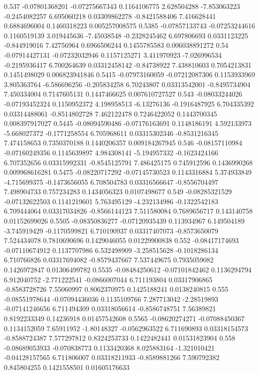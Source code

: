 {0.537 -0.07801368201 -0.07275667343 0.1164106775 2.628504288 -7.853063223 -0.2454082257 6.695060218 0.03309862278 -0.8421588406 7.416628441 0.6884696004 0.1460318223 0.005257008575
0.5385 -0.07857133743 -0.07253244616 0.1160519139 3.019445636 -7.45038548 -0.2328245462 6.697806693 0.0331123225 -0.844919016 7.42756964 0.6966506244 0.1455785583 0.006038891272
0.54 -0.07914427131 -0.07232032946 0.1157125271 3.411970923 -7.026996534 -0.2195936417 6.700264639 0.03312458142 -0.84738922 7.438810603 0.7054213831 0.1451498029 0.006823941846
0.5415 -0.07973160059 -0.07212087306 0.1153933969 3.805363764 -6.586696256 -0.205834258 6.70243807 0.03313542001 -0.8495734904 7.450334004 0.7147605131 0.1447466625 0.007610727527
0.543 -0.08033244026 -0.07193452324 0.1150952372 4.198958513 -6.13276136 -0.1916487925 6.704335392 0.03314488061 -0.8514802728 7.462122478 0.7246422052 0.1443700345 0.008397917027
0.5445 -0.08094590486 -0.07176163691 0.1148186191 4.592133973 -5.668027372 -0.1771258554 6.705968611 0.03315302346 -0.8531216345 7.474158653 0.7350370188 0.1440206357 0.009184267945
0.546 -0.08157110984 -0.07160249356 0.1145639897 4.984308141 -5.194957332 -0.1623424166 6.707352656 0.03315992331 -0.8545125791 7.486425175 0.745912596 0.1436990268 0.009968616281
0.5475 -0.08220717292 -0.07145730523 0.1143316884 5.374933849 -4.715699375 -0.1473656055 6.708504783 0.03316566647 -0.8556704497 7.498904733 0.757234283 0.1434056323 0.0107498677
0.549 -0.08285321529 -0.07132622503 0.1141219601 5.763495129 -4.232134986 -0.1322542183 6.709444064 0.03317034826 -0.8566144123 7.511580084 0.7689656717 0.143140758 0.01152699026
0.5505 -0.08350836277 -0.07120935439 0.113934967 6.149504189 -3.745919429 -0.1170599821 6.710190937 0.03317407073 -0.8573650079 7.524434078 0.7810690696 0.1429046055 0.01229900838
0.552 -0.08417174693 -0.07110674912 0.1137707986 6.532498909 -3.258515628 -0.1018286134 6.710766826 0.03317694082 -0.8579437667 7.537449675 0.7935059082 0.1426972847 0.01306499782
0.5535 -0.08484250612 -0.07101842462 0.1136294794 6.912040752 -2.771222541 -0.0866007044 6.711193804 0.03317906865 -0.8583728726 7.55060997 0.8062370975 0.1425188241 0.0138240815
0.555 -0.08551978644 -0.07094436036 0.1135109766 7.287713042 -2.28519893 -0.07141246656 6.711494309 0.03318056614 -0.8586748751 7.56389821 0.8192233349 0.14236918 0.01457542608
0.5565 -0.08620274271 -0.07088450367 0.1134152059 7.65911952 -1.80148327 -0.0562963522 6.711690893 0.03318154573 -0.8588724387 7.577297812 0.8324253733 0.1422482441 0.01531823904
0.558 -0.08689053933 -0.070838773 0.1133420368 8.025883164 -1.321010421 -0.04128157565 6.711806007 0.03318211933 -0.8589881266 7.590792382 0.845804255 0.1421558501 0.01605176633
}
